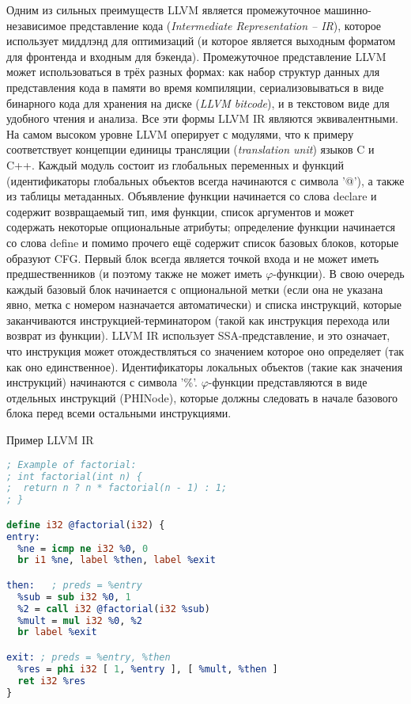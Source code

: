 Одним из сильных преимуществ LLVM является промежуточное машинно-независимое представление кода (\textit{Intermediate Representation -- IR}), которое использует миддлэнд для оптимизаций (и которое является выходным форматом для фронтенда и входным для бэкенда). Промежуточное представление LLVM может использоваться в трёх разных формах: как набор структур данных для представления кода в памяти во время компиляции, сериализовываться в виде бинарного кода для хранения на диске (\textit{LLVM bitcode}), и в текстовом виде для удобного чтения и анализа. Все эти формы LLVM IR являются эквивалентными. На самом высоком уровне LLVM оперирует с модулями, что к примеру соответствует концепции единицы трансляции (\textit{translation unit}) языков C и C++. Каждый модуль состоит из глобальных переменных и функций (идентификаторы глобальных объектов всегда начинаются с символа '@'), а также из таблицы метаданных. Объявление функции начинается со слова declare и содержит возвращаемый тип, имя функции, список аргументов и может содержать некоторые опциональные атрибуты; определение функции начинается со слова define и помимо прочего ещё содержит список базовых блоков, которые образуют CFG. Первый блок всегда является точкой входа и не может иметь предшественников (и поэтому также не может иметь $\varphi$-функции). В свою очередь каждый базовый блок начинается с опциональной метки (если она не указана явно, метка с номером назначается автоматически) и списка инструкций, которые заканчиваются инструкцией-терминатором (такой как инструкция перехода или возврат из функции). LLVM IR использует SSA-представление, и это означает, что инструкция может отождествляться со значением которое оно определяет (так как оно единственное). Идентификаторы локальных объектов (такие как значения инструкций) начинаются с символа '\%'. $\varphi$-функции представляются в виде отдельных инструкций (PHINode), которые должны следовать в начале базового блока перед всеми остальными инструкциями.

\begin{ListingEnv}[!h]
    \captiondelim{ } 
    \caption{Пример LLVM IR}\label{lst:results/llvmir}
    \begin{lstlisting}[language=llvm]
; Example of factorial:
; int factorial(int n) {
;  return n ? n * factorial(n - 1) : 1;
; }

define i32 @factorial(i32) {
entry:
  %ne = icmp ne i32 %0, 0
  br i1 %ne, label %then, label %exit

then:   ; preds = %entry
  %sub = sub i32 %0, 1
  %2 = call i32 @factorial(i32 %sub)
  %mult = mul i32 %0, %2
  br label %exit

exit: ; preds = %entry, %then
  %res = phi i32 [ 1, %entry ], [ %mult, %then ]
  ret i32 %res
}
    \end{lstlisting}
\end{ListingEnv}

